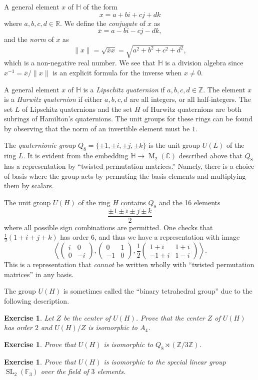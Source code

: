 \documentclass[12pt]{article}
\theoremstyle{plain}
\newtheorem{exercise}[theorem]{Exercise}
\theoremstyle{definition}
\theoremstyle{remark}
\numberwithin{equation}{section}
\begin{document}
A general element $x$ of $\mathbb{H}$ of the form
\[
x = a + bi + cj + dk
\]
where $a,b,c,d \in \mathbb{R}$.
We define the \emph{conjugate} of $x$ as
\[
\overline{x} = a -bi-cj-dk,
\]
and the \emph{norm} of $x$ as
\[
\|x\| = \sqrt{\overline{x} x} = \sqrt{a^2+b^2+c^2+d^2},
\]
which is a non-negative real number.
We see that $\mathbb{H}$ is a division algebra
since $x^{-1} = \overline{x}/\|x\|$ is an explicit formula for the
inverse when $x \ne 0$.

A general element $x$ of $\mathbb{H}$
is a \emph{Lipschitz quaternion} if
$a,b,c,d \in \mathbb{Z}$.
The element $x$ is a \emph{Hurwitz quaternion}
if either $a,b,c,d$ are all integers, or all half-integers.
The set $L$ of Lipschitz quaternions and the set $H$ of Hurwitz
quaternions are both subrings of Hamilton's quaternions.
The unit groups for these rings can be found by observing that the norm of
an invertible element must be $1$.

The \emph{quaternionic group} $Q_8 = \{\pm 1, \pm i, \pm j, \pm k\}$ is
the unit group $U(L)$ of the ring $L$.
It is evident from the embedding
$\mathbb{H} \to \operatorname{M}_2(\mathbb{C})$ described above
that $Q_8$ has a representation by ``twisted permutation
matrices.''
Namely, there is a choice of basis where the group acts by permuting
the basis elements and multiplying them by scalars.

The unit group $U(H)$ of the ring $H$ contains $Q_8$ and the 16 elements
\[
\frac{ \pm 1 \pm i \pm j \pm k }{2}
\]
where all possible sign combinations are permitted.
One checks that $\frac{1}{2}(1+i+j+k)$ has order $6$, and thus we have a
representation with image
\[
\left\langle \begin{pmatrix} i&0\\0&-i \end{pmatrix},
\begin{pmatrix} 0&1\\-1&0 \end{pmatrix},
\frac{1}{2} \begin{pmatrix} 1+i&1+i\\-1+i&1-i \end{pmatrix}\right\rangle
.
\]
This is a representation that \emph{cannot} be written wholly with
``twisted permutation matrices'' in any basis.

The group $U(H)$ is sometimes called the ``binary tetrahedral group''
due to the following description.

\begin{exercise}
Let $Z$ be the center of $U(H)$.
Prove that the center $Z$ of $U(H)$ has order $2$ and
$U(H)/Z $ is isomorphic to $A_4$.
\end{exercise}

\begin{exercise}
Prove that $U(H)$ is isomorphic to $Q_8 \rtimes (\mathbb{Z}/3\mathbb{Z})$.
\end{exercise}

\begin{exercise}
Prove that $U(H)$ is isomorphic to the special linear group
$\operatorname{SL}_2(\mathbb{F}_3)$ over the field of $3$ elements.
\end{exercise}




\end{document}

